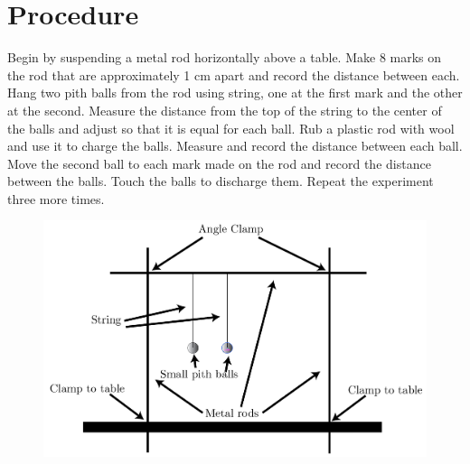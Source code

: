 \documentclass[12pt]{article}
\begin{document}
    \section{Procedure}
        Begin by suspending a metal rod horizontally above a table. Make 8 marks on the rod that are approximately 1 cm apart and record the distance between each. Hang two pith balls from the rod using string, one at the first mark and the other at the second. Measure the distance from the top of the string to the center of the balls and adjust so that it is equal for each ball. Rub a plastic rod with wool and use it to charge the balls. Measure and record the distance between each ball. Move the second ball to each mark made on the rod and record the distance between the balls. Touch the balls to discharge them. Repeat the experiment three more times. 
        \begin{figure}[H]
            \centering
            \includegraphics[width=0.9\linewidth]{experimental_setup.png}
        \end{figure}
\end{document}
